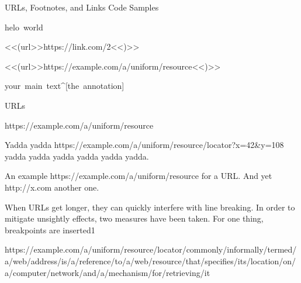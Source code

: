 
{\mktsHTwo{}URLs, Footnotes, and Links\mktsHTwoBeg}%
{\mktsHThree{}Code Samples\mktsHThreeBeg}%



\null\par{\mktsTightParagraphs{}

{\mktsStyleCode{}helo world\par
<<(url>>https://link.com/2<<)>>\par
<<(url>>https://example.com/a/uniform/resource<<)>>\par
your main text\textasciicircum{}[the annotation]\par
}

}{\mktsHThree{}URLs\mktsHThreeBeg}%

\vspace{\parskip}%
\begin{multicols}{2}

{\mktsStyleUrl{}https:\g/\g/\allowbreak{}example.com\g/\allowbreak{}a\g/\allowbreak{}uniform\g/\allowbreak{}resource\allowbreak{}}

Yadda yadda {\mktsStyleUrl{}https:\g/\g/\allowbreak{}example.com\g/\allowbreak{}a\g/\allowbreak{}uniform\g/\allowbreak{}resource\g/\allowbreak{}locator?\allowbreak{}x=42\&y=108\allowbreak{}} yadda yadda yadda yadda yadda yadda.

An example {\mktsStyleUrl{}https:\g/\g/\allowbreak{}example.com\g/\allowbreak{}a\g/\allowbreak{}uniform\g/\allowbreak{}resource\allowbreak{}} for a URL.
And yet {\mktsStyleUrl{}http:\g/\g/\allowbreak{}x.com\allowbreak{}} another one.

When URLs get longer, they can quickly interfere with line breaking. In order
to mitigate unsightly effects, two measures have been taken. For one thing,
breakpoints are inserted{\mktsEnStyleMarkMain{}1}

{\mktsStyleUrl{}https:\g/\g/\allowbreak{}example.com\g/\allowbreak{}a\g/\allowbreak{}uniform\g/\allowbreak{}resource\g/\allowbreak{}locator\g/\allowbreak{}commonly\g/\allowbreak{}informally\g/\allowbreak{}termed\g/\allowbreak{}a\g/\allowbreak{}web\g/\allowbreak{}address\g/\allowbreak{}is\g/\allowbreak{}a\g/\allowbreak{}reference\g/\allowbreak{}to\g/\allowbreak{}a\g/\allowbreak{}web\g/\allowbreak{}resource\g/\allowbreak{}that\g/\allowbreak{}specifies\g/\allowbreak{}its\g/\allowbreak{}location\g/\allowbreak{}on\g/\allowbreak{}a\g/\allowbreak{}computer\g/\allowbreak{}network\g/\allowbreak{}and\g/\allowbreak{}a\g/\allowbreak{}mechanism\g/\allowbreak{}for\g/\allowbreak{}retrieving\g/\allowbreak{}it\allowbreak{}}


\end{multicols}

